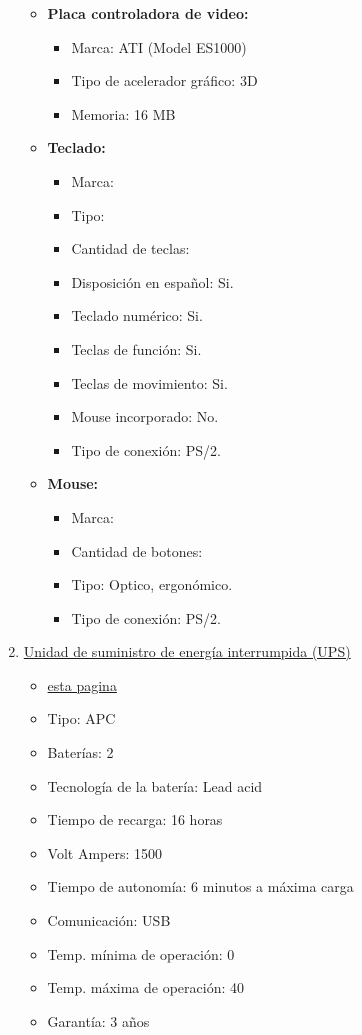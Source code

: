 \begin{enumerate}
\begin{itemize}
    \item \textbf{Placa controladora de video:}
    \begin{itemize}
      \item Marca: ATI (Model ES1000)
      \item Tipo de acelerador gráfico: 3D
      \item Memoria: 16 MB
    \end{itemize}
    
    \item \textbf{Teclado:}
    \begin{itemize}
      \item Marca: 
      \item Tipo:
      \item Cantidad de teclas:
      \item Disposición en español: Si.
      \item Teclado numérico: Si.
      \item Teclas de función: Si.
      \item Teclas de movimiento: Si.
      \item Mouse incorporado: No.
      \item Tipo de conexión: PS/2.
    \end{itemize}
    
    \item \textbf{Mouse:} 
    \begin{itemize}
      \item Marca:
      \item Cantidad de botones:
      \item Tipo: Optico, ergonómico.
      \item Tipo de conexión: PS/2.
    \end{itemize}
  \end{itemize}
  
  \item \underline{Unidad de suministro de energía interrumpida (UPS)}
  \begin{itemize}
    \item {} \href{http://accessories.us.dell.com/sna/productdetail.aspx?c=us&l=en&s=bsd&cs=04&sku=A0973336}{esta pagina}
    \item Tipo: APC
    \item Baterías: 2
    \item Tecnología de la batería: Lead acid
    \item Tiempo de recarga: 16 horas
    \item Volt Ampers: 1500
    \item Tiempo de autonomía: 6 minutos a máxima carga
    \item Comunicación: USB
    \item Temp. mínima de operación: 0 \textcelsius
    \item Temp. máxima de operación: 40 \textcelsius
    \item Garantía: 3 años 
  \end{itemize}
      
\end{enumerate}
